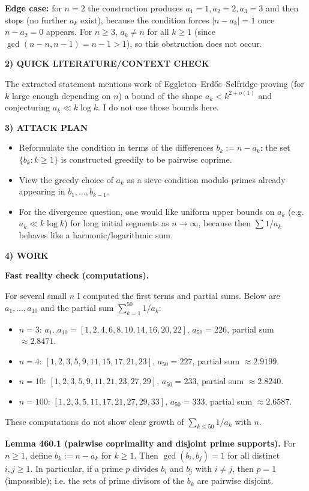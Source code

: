 \textbf{Edge case:} for $n=2$ the construction produces $a_1=1,a_2=2,a_3=3$ and then stops (no further $a_k$ exist), because the condition forces $|n-a_k|=1$ once $n-a_2=0$ appears. For $n\ge 3$, $a_k\neq n$ for all $k\ge 1$ (since $\gcd(n-n,n-1)=n-1>1$), so this obstruction does not occur.

\noindent\textbf{2) QUICK LITERATURE/CONTEXT CHECK}

The extracted statement mentions work of Eggleton--Erd\H{o}s--Selfridge proving (for $k$ large enough depending on $n$) a bound of the shape $a_k<k^{2+o(1)}$ and conjecturing $a_k\ll k\log k$. I do not use those bounds here.

\noindent\textbf{3) ATTACK PLAN}

\begin{itemize}
\item Reformulate the condition in terms of the differences $b_k:=n-a_k$: the set $\{b_k:k\ge 1\}$ is constructed greedily to be pairwise coprime.
\item View the greedy choice of $a_k$ as a sieve condition modulo primes already appearing in $b_1,\dots,b_{k-1}$.
\item For the divergence question, one would like uniform upper bounds on $a_k$ (e.g. $a_k\ll k\log k$) for long initial segments as $n\to\infty$, because then $\sum 1/a_k$ behaves like a harmonic/logarithmic sum.
\end{itemize}

\noindent\textbf{4) WORK}

\textbf{Fast reality check (computations).}

For several small $n$ I computed the first terms and partial sums.  Below are $a_1,\dots,a_{10}$ and the partial sum $\sum_{k=1}^{50}1/a_k$:
\begin{itemize}
\item $n=3$: $a_1..a_{10}=[1,2,4,6,8,10,14,16,20,22]$, $a_{50}=226$, partial sum $\approx 2.8471$.
\item $n=4$: $[1,2,3,5,9,11,15,17,21,23]$, $a_{50}=227$, partial sum $\approx 2.9199$.
\item $n=10$: $[1,2,3,5,9,11,21,23,27,29]$, $a_{50}=233$, partial sum $\approx 2.8240$.
\item $n=100$: $[1,2,3,5,11,17,21,27,29,33]$, $a_{50}=333$, partial sum $\approx 2.6587$.
\end{itemize}
These computations do not show clear growth of $\sum_{k\le 50}1/a_k$ with $n$.

\medskip
\noindent\textbf{Lemma 460.1 (pairwise coprimality and disjoint prime supports).}
For $n\ge 1$, define $b_k:=n-a_k$ for $k\ge 1$.  Then $\gcd(b_i,b_j)=1$ for all distinct $i,j\ge 1$. In particular, if a prime $p$ divides $b_i$ and $b_j$ with $i\neq j$, then $p=1$ (impossible); i.e. the sets of prime divisors of the $b_k$ are pairwise disjoint.

